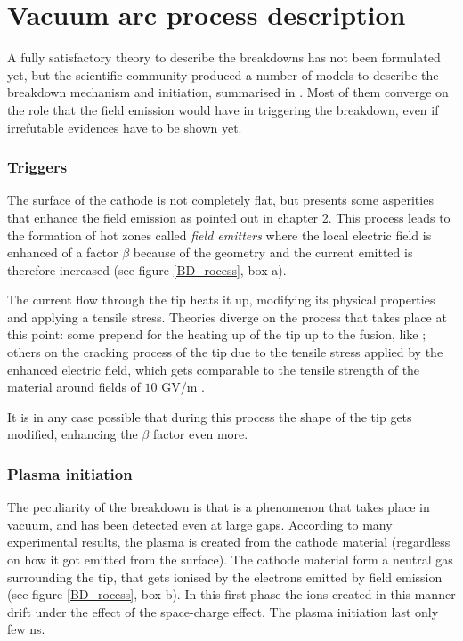 \section[Vacuum arc process description]{Vacuum arc process description}

A fully satisfactory theory to describe the breakdowns has not been formulated yet, but the scientific community produced a number of models to describe the breakdown mechanism and initiation, summarised in \cite{soviet:1983,davies:triggers}. Most of them converge on the role that the field emission would have in triggering the breakdown, even if irrefutable  evidences have to be shown yet.

\subsubsection[Triggers]{Triggers}

The surface of the cathode is not completely flat, but presents some asperities that enhance the field emission as pointed out in chapter 2. This process leads to the formation of hot zones called \textit{field emitters} where the local electric field is enhanced of a factor $\beta$ because of the geometry and the current emitted is therefore increased (see figure \ref{BD_rocess}, box a). 

The current flow through the tip heats it up, modifying its physical properties and applying a tensile stress. Theories diverge on the process that takes place at this point: some prepend for the heating up of the tip up to the fusion, like \cite{Grudiev:newLoc}; others on the cracking process of the tip due to the tensile stress applied by the enhanced electric field, which gets comparable to the tensile strength of the material around fields of $10$ GV/m  \cite{Insepov:1373092}.

It is in any case possible that during this process the shape of the tip gets modified, enhancing the $\beta$ factor even more.


\subsubsection[Plasma initiation]{Plasma initiation}

The peculiarity of the breakdown is that is a phenomenon that takes place in vacuum, and has been detected even at large gaps. According to many experimental results, the plasma is created from the cathode material (regardless on how it got emitted from the surface). The cathode material form a neutral gas surrounding the tip, that gets ionised by the electrons emitted by field emission (see figure \ref{BD_rocess}, box b). In this first phase the ions created in this manner drift under the effect of the space-charge effect. The plasma initiation last only few ns.

